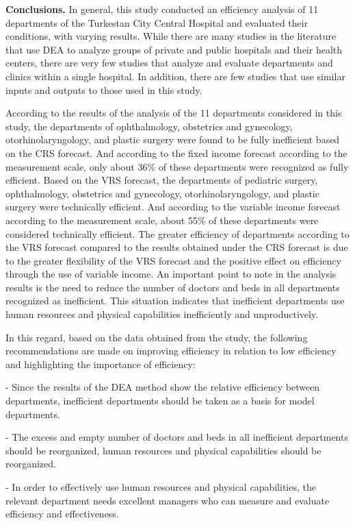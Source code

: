 {\bfseries Conclusions.} In general, this study conducted an efficiency
analysis of 11 departments of the Turkestan City Central Hospital and
evaluated their conditions, with varying results. While there are many
studies in the literature that use DEA to analyze groups of private and
public hospitals and their health centers, there are very few studies
that analyze and evaluate departments and clinics within a single
hospital. In addition, there are few studies that use similar inputs and
outputs to those used in this study.

According to the results of the analysis of the 11 departments
considered in this study, the departments of ophthalmology, obstetrics
and gynecology, otorhinolaryngology, and plastic surgery were found to
be fully inefficient based on the CRS forecast. And according to the
fixed income forecast according to the measurement scale, only about
36\% of these departments were recognized as fully efficient. Based on
the VRS forecast, the departments of pediatric surgery, ophthalmology,
obstetrics and gynecology, otorhinolaryngology, and plastic surgery were
technically efficient. And according to the variable income forecast
according to the measurement scale, about 55\% of these departments were
considered technically efficient. The greater efficiency of departments
according to the VRS forecast compared to the results obtained under the
CRS forecast is due to the greater flexibility of the VRS forecast and
the positive effect on efficiency through the use of variable income. An
important point to note in the analysis results is the need to reduce
the number of doctors and beds in all departments recognized as
inefficient. This situation indicates that inefficient departments use
human resources and physical capabilities inefficiently and
unproductively.

In this regard, based on the data obtained from the study, the following
recommendations are made on improving efficiency in relation to low
efficiency and highlighting the importance of efficiency:

- Since the results of the DEA method show the relative efficiency
between departments, inefficient departments should be taken as a basis
for model departments.

- The excess and empty number of doctors and beds in all inefficient
departments should be reorganized, human resources and physical
capabilities should be reorganized.

- In order to effectively use human resources and physical capabilities,
the relevant department needs excellent managers who can measure and
evaluate efficiency and effectiveness.

